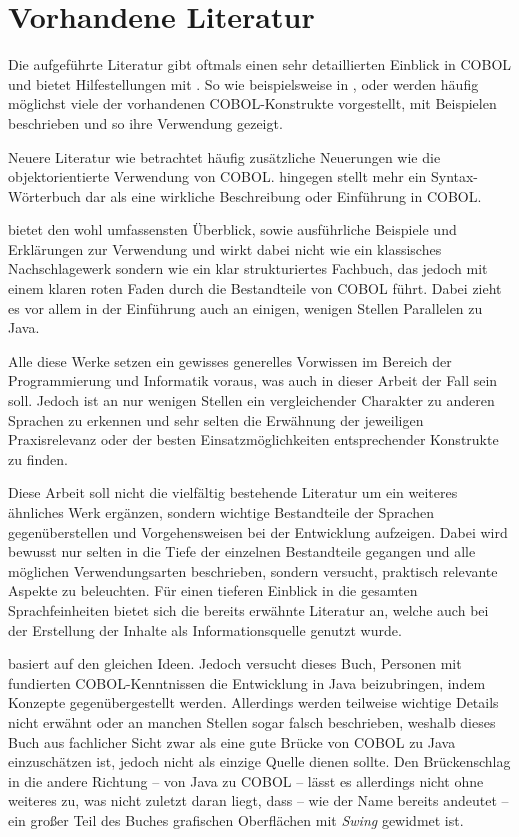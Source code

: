 \section{Vorhandene Literatur}
Die aufgeführte Literatur gibt oftmals einen sehr detaillierten Einblick in COBOL und bietet Hilfestellungen mit . So wie beispielsweise in ,   oder  werden häufig möglichst viele der vorhandenen COBOL-Konstrukte vorgestellt, mit Beispielen beschrieben und so ihre Verwendung gezeigt. 

Neuere Literatur wie  betrachtet häufig zusätzliche Neuerungen wie die objektorientierte Verwendung von COBOL.  
hingegen stellt mehr ein Syntax-Wörterbuch dar als eine wirkliche Beschreibung oder Einführung in COBOL.

 bietet den wohl umfassensten Überblick, sowie ausführliche Beispiele und Erklärungen zur Verwendung und wirkt dabei nicht wie ein klassisches Nachschlagewerk sondern wie ein klar strukturiertes Fachbuch, das jedoch mit einem klaren roten Faden durch die Bestandteile von COBOL führt. Dabei zieht es vor allem in der Einführung auch an einigen, wenigen Stellen Parallelen zu Java. 

Alle diese Werke setzen ein gewisses generelles Vorwissen im Bereich der Programmierung und Informatik voraus, was auch in dieser Arbeit der Fall sein soll. Jedoch ist an nur wenigen Stellen ein vergleichender Charakter zu anderen Sprachen zu erkennen und sehr selten die Erwähnung der jeweiligen Praxisrelevanz oder der besten Einsatzmöglichkeiten entsprechender Konstrukte zu finden. 

Diese Arbeit soll nicht die vielfältig bestehende Literatur um ein weiteres ähnliches Werk ergänzen, sondern wichtige Bestandteile der Sprachen gegenüberstellen und Vorgehensweisen bei der Entwicklung aufzeigen. Dabei wird bewusst nur selten in die Tiefe der einzelnen Bestandteile gegangen und alle möglichen Verwendungsarten beschrieben, sondern versucht, praktisch relevante Aspekte zu beleuchten. Für einen tieferen Einblick in die gesamten Sprachfeinheiten bietet sich die bereits erwähnte Literatur an, welche auch bei der Erstellung der Inhalte als Informationsquelle genutzt wurde.

 basiert auf den gleichen Ideen. Jedoch versucht dieses Buch, Personen mit fundierten COBOL-Kenntnissen die Entwicklung in Java beizubringen, indem Konzepte gegenübergestellt werden. Allerdings werden teilweise wichtige Details nicht erwähnt oder an manchen Stellen sogar falsch beschrieben, weshalb dieses Buch aus fachlicher Sicht zwar als eine gute Brücke von COBOL zu Java einzuschätzen ist, jedoch nicht als einzige Quelle dienen sollte. Den Brückenschlag in die andere Richtung -- von Java zu COBOL -- lässt es allerdings nicht ohne weiteres zu, was nicht zuletzt daran liegt, dass -- wie der Name bereits andeutet -- ein großer Teil des Buches grafischen Oberflächen mit \textit{Swing} gewidmet ist.

